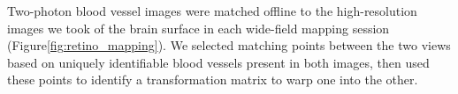 Two-photon blood vessel images were matched offline to the high-resolution images we took of the brain surface in each wide-field mapping session (Figure\ref{fig:retino_mapping}). We selected matching points between the two views based on uniquely identifiable blood vessels present in both images, then used these points to identify a transformation matrix to warp one into the other.






